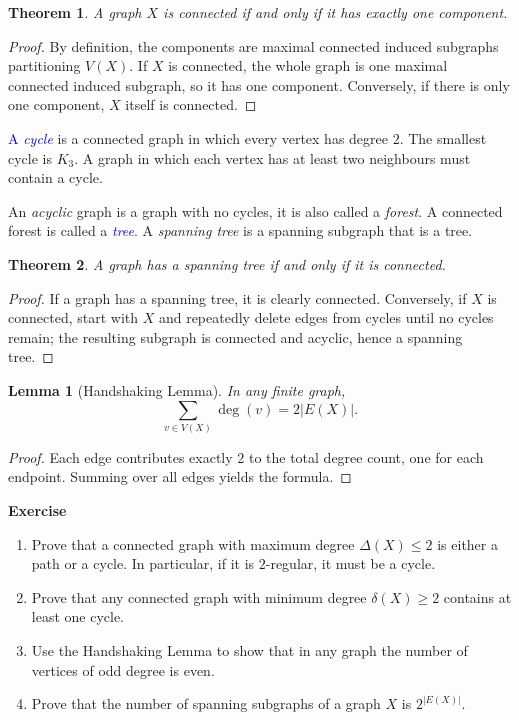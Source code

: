 \documentclass[12pt,a4paper,openany]{book}
\newtheorem{theorem}{Theorem}[section]
\newtheorem{lemma}{Lemma}[section]
\begin{document}
\begin{theorem}
A graph $X$ is connected if and only if it has exactly one component.
\end{theorem}

\begin{proof}
By definition, the components are maximal connected induced subgraphs partitioning $V(X)$.  
If $X$ is connected, the whole graph is one maximal connected induced subgraph, so it has one component.  
Conversely, if there is only one component, $X$ itself is connected.
\end{proof}

\noindent\textcolor{blue}{A \emph{cycle}} is a connected graph in which every vertex has degree $2$.  
The smallest cycle is $K_3$. A graph in which each vertex has at least two neighbours must contain a cycle.

\noindent An \emph{acyclic} graph  is a graph with no cycles, it is also called a \emph{forest}.  A connected forest is called a \textcolor{blue}{\emph{tree}}. A \emph{spanning tree} is a spanning subgraph that is a tree.

\begin{theorem}
A graph has a spanning tree if and only if it is connected.
\end{theorem}

\begin{proof}
If a graph has a spanning tree, it is clearly connected.  
Conversely, if $X$ is connected, start with $X$ and repeatedly delete edges from cycles until no cycles remain;  
the resulting subgraph is connected and acyclic, hence a spanning tree.
\end{proof}

\begin{lemma}[Handshaking Lemma]
In any finite graph,
\[
\sum_{v \in V(X)} \deg(v) = 2|E(X)|.
\]
\end{lemma}
\begin{proof}
Each edge contributes exactly $2$ to the total degree count, one for each endpoint.  
Summing over all edges yields the formula.
\end{proof}

\bigskip\noindent\textbf{Exercise}
\begin{enumerate}
    \item Prove that a connected graph with maximum degree $\Delta(X) \le 2$ is either a path or a cycle.  
          In particular, if it is $2$-regular, it must be a cycle.
    \item Prove that any connected graph with minimum degree $\delta(X) \ge 2$ contains at least one cycle.
    \item Use the Handshaking Lemma to show that in any graph the number of vertices of odd degree is even.
    \item Prove that the number of spanning subgraphs of a graph $X$ is $2^{|E(X)|}$.
\end{enumerate}
\end{document}
